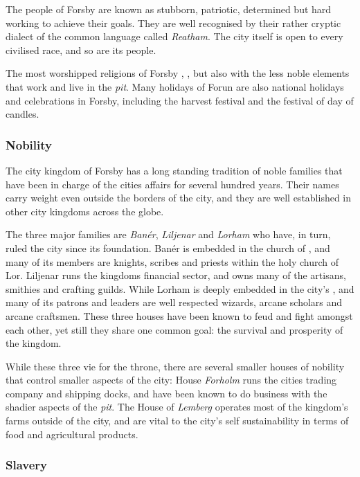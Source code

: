 The people of Forsby are known as stubborn, patriotic, determined but hard
working to achieve their goals. They are well recognised by their rather
cryptic dialect of the common language called \emph{Reatham}. The city itself
is open to every civilised race, and so are its people.

The most worshipped religions of Forsby ,
, but also  with the less noble elements
that work and live in the \emph{pit}. Many holidays of Forun are also national
holidays and celebrations in Forsby, including the harvest festival and the
festival of day of candles.

\subsubsection{Nobility}

The city kingdom of Forsby has a long standing tradition of noble
families that have been in charge of the cities affairs for several hundred
years. Their names carry weight even outside the borders of the city, and
they are well established in other city kingdoms across the globe.

The three major families are \emph{Banér}, \emph{Liljenar} and \emph{Lorham}
who have, in turn, ruled the city since its foundation. Banér is embedded in the
church of , and many of its members are knights, scribes and
priests within the holy church of Lor. Liljenar runs the kingdoms financial
sector, and owns many of the artisans, smithies and crafting guilds. While
Lorham is deeply embedded in the city's , and
many of its patrons and leaders are well respected wizards, arcane scholars
and arcane craftsmen. These three houses have been known to feud and fight
amongst each other, yet still they share one common goal: the survival and
prosperity of the kingdom.

While these three vie for the throne, there are several smaller houses of
nobility that control smaller aspects of the city: House \emph{Forholm} runs
the cities trading company and shipping docks, and have been known to do
business with the shadier aspects of the \emph{pit}. The House of
\emph{Lemberg} operates most of the kingdom's farms outside of the city, and
are vital to the city's self sustainability in terms of food and agricultural
products.

\subsubsection{Slavery}

